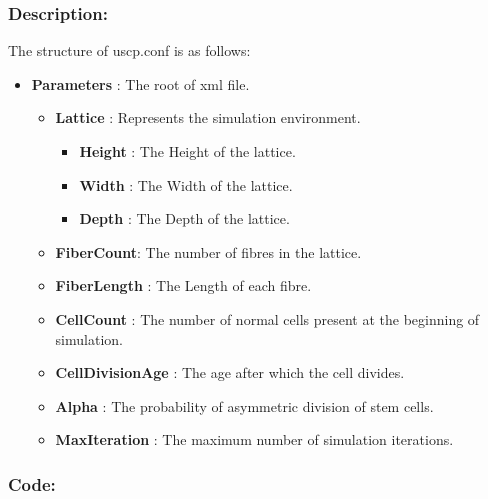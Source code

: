 \documentclass[11pt]{report}
\begin{document}
  \subsubsection{\color{green}Description: }
  The structure of uscp.conf is as follows:
  \begin{itemize}
   \item \textbf{Parameters} : The root of xml file.
   \begin{itemize}
    \item \textbf{Lattice} : Represents the simulation environment.
    \begin{itemize}
     \item \textbf{Height} : The Height of the lattice.
     \item \textbf{Width} : The Width of the lattice.
     \item \textbf{Depth} : The Depth of the lattice.
    \end{itemize}

    \item \textbf{FiberCount}: The number of fibres in the lattice.
    \item \textbf{FiberLength} : The Length of each fibre.
    \item \textbf{CellCount} : The number of normal cells present at the beginning of simulation.
    \item \textbf{CellDivisionAge} : The age after which the cell divides.
    \item \textbf{Alpha} : The probability of asymmetric division of stem cells.
    \item \textbf{MaxIteration} : The maximum number of simulation iterations.

   \end{itemize}

  \end{itemize}
  
  \subsubsection{\color{green}Code: }
  \lstset{language=XML}
  


  
 
 
\end{document}
